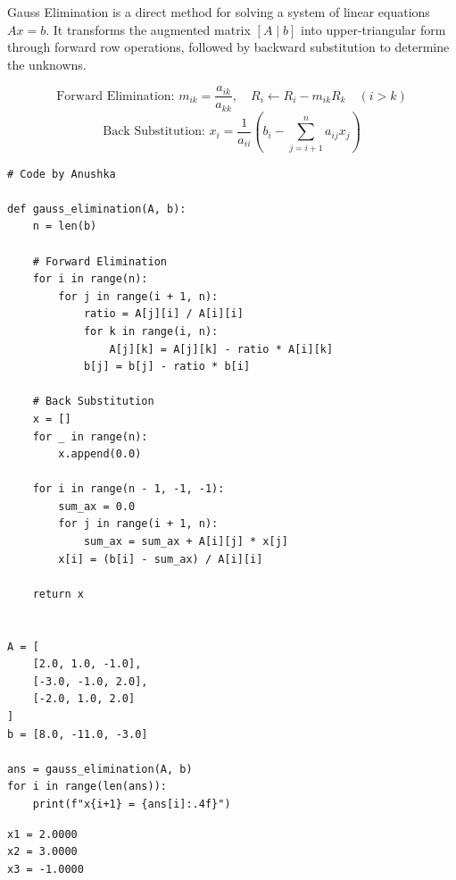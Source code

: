 \documentclass[10pt,a4paper]{report}
\begin{document}
Gauss Elimination is a direct method for solving a system of linear equations $A x = b$. It transforms the augmented matrix $[A \mid b]$ into upper-triangular form through forward row operations, followed by backward substitution to determine the unknowns.

\begin{tcolorbox}[colback=theorybg,colframe=theoryframe,title=\textbf{Mathematical Theory \& Formulation},boxrule=1pt,arc=2mm]
\[
\text{Forward Elimination: } m_{ik} = \frac{a_{ik}}{a_{kk}}, \quad R_i \leftarrow R_i - m_{ik} R_k \quad (i > k)
\]
\[
\text{Back Substitution: } x_i = \frac{1}{a_{ii}}\left(b_i - \sum_{j=i+1}^n a_{ij} x_j\right)
\]
\end{tcolorbox}

\begin{tcolorbox}[colback=codebg,colframe=secondary,title=\textbf{Python Implementation (Step-by-Step Loops \& Pure Functions)},boxrule=1pt,arc=2mm]
\begin{lstlisting}[style=python_detailed]
# Code by Anushka

def gauss_elimination(A, b):
    n = len(b)

    # Forward Elimination
    for i in range(n):
        for j in range(i + 1, n):
            ratio = A[j][i] / A[i][i]
            for k in range(i, n):
                A[j][k] = A[j][k] - ratio * A[i][k]
            b[j] = b[j] - ratio * b[i]

    # Back Substitution
    x = []
    for _ in range(n):
        x.append(0.0)

    for i in range(n - 1, -1, -1):
        sum_ax = 0.0
        for j in range(i + 1, n):
            sum_ax = sum_ax + A[i][j] * x[j]
        x[i] = (b[i] - sum_ax) / A[i][i]

    return x


A = [
    [2.0, 1.0, -1.0],
    [-3.0, -1.0, 2.0],
    [-2.0, 1.0, 2.0]
]
b = [8.0, -11.0, -3.0]

ans = gauss_elimination(A, b)
for i in range(len(ans)):
    print(f"x{i+1} = {ans[i]:.4f}")

\end{lstlisting}
\end{tcolorbox}

\begin{tcolorbox}[colback=termbg,colframe=primary,title=\textbf{Program Execution Output \& Convergence Table},boxrule=1pt,arc=2mm]
\begin{lstlisting}[style=terminal_output]
x1 = 2.0000
x2 = 3.0000
x3 = -1.0000
\end{lstlisting}
\end{tcolorbox}
\end{document}
